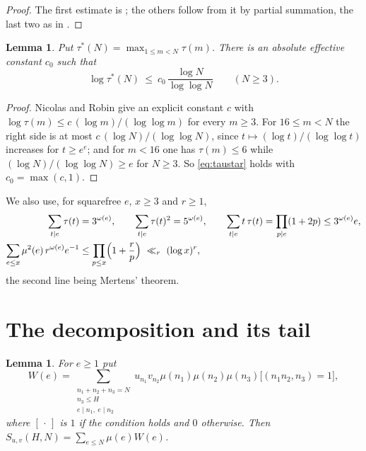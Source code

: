 \documentclass[11pt,a4paper]{article}
\theoremstyle{plain}
\newtheorem{lemma}[theorem]{Lemma}
\theoremstyle{remark}
\newcommand{\Suv}{S_{u,v}}
\newcommand{\taustar}{\tau^{*}}
\begin{document}
\begin{proof}
The first estimate is \cite[(1.81)]{IK}; the others follow from it by partial summation, the last two
as in \cite[(3.11), (3.12)]{BS}.
\end{proof}

\begin{lemma}\label{lem:taustar}
Put $\taustar(N)=\max_{1\le m<N}\tau(m)$. There is an absolute effective constant $c_0$ such that
\begin{equation}\label{eq:taustar}
  \log\taustar(N)\ \le\ c_0\,\frac{\log N}{\log\log N}\qquad(N\ge3).
\end{equation}
\end{lemma}

\begin{proof}
Nicolas and Robin \cite{NR} give an explicit constant $c$ with
$\log\tau(m)\le c\,(\log m)/(\log\log m)$ for every $m\ge3$. For $16\le m<N$ the right side is at most
$c\,(\log N)/(\log\log N)$, since $t\mapsto(\log t)/(\log\log t)$ increases for $t\ge e^{e}$; and for
$m<16$ one has $\tau(m)\le6$ while $(\log N)/(\log\log N)\ge e$ for $N\ge3$. So \eqref{eq:taustar}
holds with $c_0=\max(c,1)$.
\end{proof}

We also use, for squarefree $e$, $x\ge3$ and $r\ge1$,
\begin{align}
  \label{eq:omegasum}
  \sum_{t\mid e}\tau(t)&=3^{\omega(e)},\qquad
  \sum_{t\mid e}\tau(t)^{2}=5^{\omega(e)},\qquad
  \sum_{t\mid e}t\,\tau(t)=\prod_{p\mid e}(1+2p)\le 3^{\omega(e)}e,\\
  \label{eq:mertens}
  \sum_{e\le x}\mu^{2}(e)\,r^{\omega(e)}e^{-1}&\le\prod_{p\le x}\Bigl(1+\frac rp\Bigr)
  \ \ll_r\ (\log x)^{r},
\end{align}
the second line being Mertens' theorem.

\section{The decomposition and its tail}\label{sec:decomp}

\begin{lemma}\label{lem:decomp}
For $e\ge1$ put
\begin{equation}\label{eq:W}
  W(e)=\sum_{\substack{n_1+n_2+n_3=N\\ n_3\le H\\ e\mid n_1,\ e\mid n_2}}
  u_{n_1}v_{n_2}\mu(n_1)\mu(n_2)\mu(n_3)\bigl[(n_1n_2,n_3)=1\bigr],
\end{equation}
where $[\,\cdot\,]$ is $1$ if the condition holds and $0$ otherwise. Then
$\Suv(H,N)=\sum_{e\le N}\mu(e)W(e)$.
\end{lemma}
\end{document}
